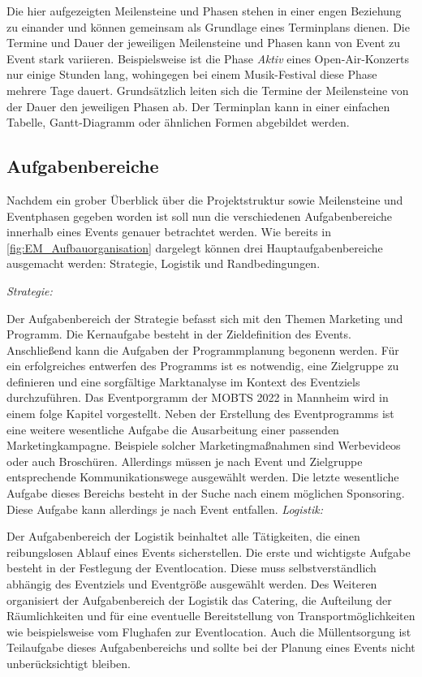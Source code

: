 Die hier aufgezeigten Meilensteine und Phasen stehen in einer engen Beziehung zu einander und können gemeinsam als Grundlage eines Terminplans dienen.
Die Termine und Dauer der jeweiligen Meilensteine und Phasen kann von Event zu Event stark variieren.
Beispielsweise ist die Phase \textit{Aktiv} eines Open-Air-Konzerts nur einige Stunden lang, wohingegen bei einem Musik-Festival diese Phase mehrere Tage dauert.
Grundsätzlich leiten sich die Termine der Meilensteine von der Dauer den jeweiligen Phasen ab.
Der Terminplan kann in einer einfachen Tabelle, Gantt-Diagramm oder ähnlichen Formen abgebildet werden.\autocite[Vgl.][S. 24 ff.]{Holzbaur.2002}

\subsection{Aufgabenbereiche}
Nachdem ein grober Überblick über die Projektstruktur sowie Meilensteine und Eventphasen gegeben worden ist soll nun die verschiedenen Aufgabenbereiche innerhalb eines Events genauer betrachtet werden.
Wie bereits in \autoref{fig:EM_Aufbauorganisation} dargelegt können drei Hauptaufgabenbereiche ausgemacht werden: Strategie, Logistik und Randbedingungen. 

\textit{Strategie:}

Der Aufgabenbereich der Strategie befasst sich mit den Themen Marketing und Programm.
Die Kernaufgabe besteht in der Zieldefinition des Events.
Anschließend kann die Aufgaben der Programmplanung begonenn werden.
Für ein erfolgreiches entwerfen des Programms ist es notwendig, eine Zielgruppe zu definieren und eine sorgfältige Marktanalyse im Kontext des Eventziels durchzuführen.
Das Eventporgramm der MOBTS 2022 in Mannheim wird in einem folge Kapitel vorgestellt.
Neben der Erstellung des Eventprogramms ist eine weitere wesentliche Aufgabe die Ausarbeitung einer passenden Marketingkampagne.
Beispiele solcher Marketingmaßnahmen sind Werbevideos oder auch Broschüren.
Allerdings müssen je nach Event und Zielgruppe entsprechende Kommunikationswege ausgewählt werden.
Die letzte wesentliche Aufgabe dieses Bereichs besteht in der Suche nach einem möglichen Sponsoring.
Diese Aufgabe kann allerdings je nach Event entfallen.
\newpage
\textit{Logistik:}

Der Aufgabenbereich der Logistik beinhaltet alle Tätigkeiten, die einen reibungslosen Ablauf eines Events sicherstellen.
Die erste und wichtigste Aufgabe besteht in der Festlegung der Eventlocation.
Diese muss selbstverständlich abhängig des Eventziels und Eventgröße ausgewählt werden.
Des Weiteren organisiert der Aufgabenbereich der Logistik das Catering, die Aufteilung der Räumlichkeiten und für eine eventuelle Bereitstellung von Transportmöglichkeiten wie beispielsweise vom Flughafen zur Eventlocation.
Auch die Müllentsorgung ist Teilaufgabe dieses Aufgabenbereichs und sollte bei der Planung eines Events nicht unberücksichtigt bleiben.

